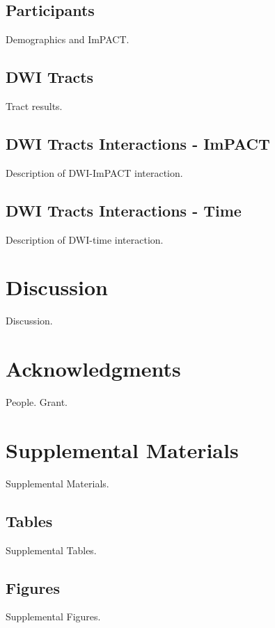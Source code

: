 \documentclass[12pt]{article}
\newcommand{\beginsupplement}{%
	\setcounter{table}{0}
	\renewcommand{\thetable}{S\arabic{table}}%
	\setcounter{figure}{0}
	\renewcommand{\thefigure}{S\arabic{figure}}%
}
\begin{document}
\subsection{Participants}
\label{ssec:res-participants}
Demographics and ImPACT.


\subsection{DWI Tracts}
\label{ssec:res-dwi-tract}
Tract results.


\subsection{DWI Tracts Interactions - ImPACT}
\label{ssec:res-dwi-imp}
Description of DWI-ImPACT interaction.

\subsection{DWI Tracts Interactions - Time}
\label{ssec:res-dwi-time}
Description of DWI-time interaction.


\section{Discussion}
\label{sec:disc}
Discussion.


\section*{Acknowledgments}
\label{sec:ack}
People. Grant.

\pagebreak
\pagebreak


\section{Supplemental Materials}
\label{sec:supp-materials}
\beginsupplement
Supplemental Materials.



\subsection{Tables}
\label{ssec:supp-tables}
Supplemental Tables.


\subsection{Figures}
\label{ssec:supp-figures}
Supplemental Figures.
\end{document}
